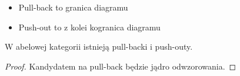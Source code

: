 \begin{definition}$ $\newline
  \begin{itemize}
    \item Pull-back to granica diagramu
      \begin{center}\end{center}
    \item Push-out to z kolei kogranica diagramu
      \begin{center}\end{center}
  \end{itemize}
\end{definition}

\begin{fact}
  W abelowej kategorii istnieją pull-backi i push-outy.
\end{fact}

\begin{proof}
  Kandydatem na pull-back będzie jądro odwzorowania.
\end{proof}

